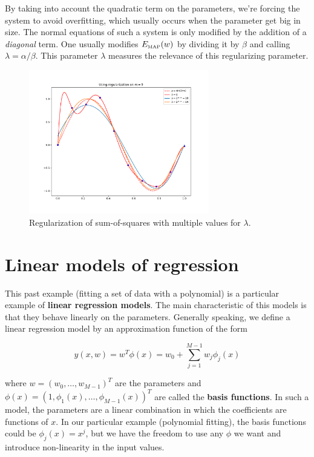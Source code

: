 By taking into account the quadratic term on the parameters, we're forcing the system to avoid overfitting, which usually occurs when the parameter get big in size. The normal equations of such a system is only modified by the addition of a \textit{diagonal} term. One usually modifies $E_{\tiny\mbox{MAP}}(w)$ by dividing it by $\beta$ and calling $\lambda = \alpha/\beta$. This parameter $\lambda$ measures the relevance of this regularizing parameter.

\begin{figure}
	\centering
	\includegraphics[width=0.7\textwidth]{images/regularization.pdf}
	\caption{Regularization of sum-of-squares with multiple values for $\lambda$.}
\end{figure}

\section{Linear models of regression}

This past example (fitting a set of data with a polynomial) is a particular example of \textbf{linear regression models}. The main characteristic of this models is that they behave linearly on the parameters. Generally speaking, we define a linear regression model by an approximation function of the form

\[y(x,w) = w^T\phi(x) = w_0 + \sum_{j=1}^{M-1}w_j\phi_j(x)\]

where $w = (w_0,\dots,w_{M-1})^T$ are the parameters and $\phi(x) = (1, \phi_1(x),\dots, \phi_{M-1}(x))^T$ are called the \textbf{basis functions}. In such a model, the parameters are a linear combination in which the coefficients are functions of $x$. In our particular example (polynomial fitting), the basis functions could be $\phi_j(x) = x^j$, but we have the freedom to use any $\phi$ we want and introduce non-linearity in the input values.

